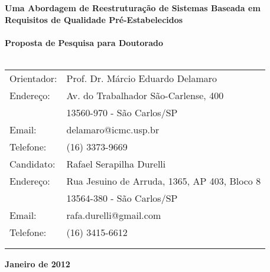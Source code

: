 \documentclass[a4paper,12pt]{article}
\begin{document}
\begin{center}
\vspace*{1cm}
{\fontsize{17.28}{20}\sffamily\bfseries\selectfont Uma Abordagem de Reestruturação de Sistemas Baseada em Requisitos de Qualidade Pré-Estabelecidos \\\ \\

Proposta de Pesquisa para Doutorado\\ \ \\
\vspace{3cm}}


\begin{table}[!th]
  \begin{center}
    \begin{tabular}{ll}

	  Orientador:      &  Prof. Dr. Márcio Eduardo Delamaro     \\
      Endereço:        &  Av. do Trabalhador São-Carlense, 400                    \\
	                   &  13560-970 - São Carlos/SP                               \\
      Email:           &  delamaro@icmc.usp.br                                     \\
	  
	  \vspace{0.6cm}
      Telefone:        &  (16) 3373-9669                                           \\

	  Candidato:       & Rafael Serapilha Durelli                             \\
	  Endereço:        & Rua Jesuino de Arruda, 1365, AP  403, Bloco 8 \\
                       & 13564-380 - São Carlos/SP                                 \\
      Email:           & rafa.durelli@gmail.com                                      \\
      Telefone:        & (16) 3415-6612                                            \\ \\
      \vspace{1cm}

    \end{tabular}
  \end{center}
\end{table}

\vfill
{\fontsize{18}{20}\sffamily\bfseries\selectfont Janeiro de 2012}

\end{center}
\end{document}
